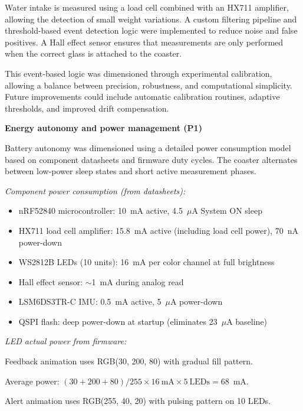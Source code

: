 \documentclass{article}
\begin{document}
Water intake is measured using a load cell combined with an HX711 amplifier, allowing the detection of small weight variations. A custom filtering pipeline and threshold-based event detection logic were implemented to reduce noise and false positives. A Hall effect sensor ensures that measurements are only performed when the correct glass is attached to the coaster.\vspace{0.2cm}

This event-based logic was dimensioned through experimental calibration, allowing a balance between precision, robustness, and computational simplicity. Future improvements could include automatic calibration routines, adaptive thresholds, and improved drift compensation.\vspace{0.2cm}

\noindent \textbf{Energy autonomy and power management (P1)}\vspace{0.2cm}

Battery autonomy was dimensioned using a detailed power consumption model based on component datasheets and firmware duty cycles. The coaster alternates between low-power sleep states and short active measurement phases.\vspace{0.2cm}

\textit{Component power consumption (from datasheets):}
\begin{itemize}
    \item nRF52840 microcontroller: 10~mA active, 4.5~$\mu$A System ON sleep
    \item HX711 load cell amplifier: 15.8~mA active (including load cell power), 70~nA power-down
    \item WS2812B LEDs (10 units): 16~mA per color channel at full brightness
    \item Hall effect sensor: $\sim$1~mA during analog read
    \item LSM6DS3TR-C IMU: 0.5~mA active, 5~$\mu$A power-down
    \item QSPI flash: deep power-down at startup (eliminates 23~$\mu$A baseline)
\end{itemize}

\textit{LED actual power from firmware:}

Feedback animation uses RGB(30, 200, 80) with gradual fill pattern. 

Average power: $(30 + 200 + 80) / 255 \times 16~\text{mA} \times 5~\text{LEDs} = 68$~mA. 

Alert animation uses RGB(255, 40, 20) with pulsing pattern on 10 LEDs. 
\end{document}
